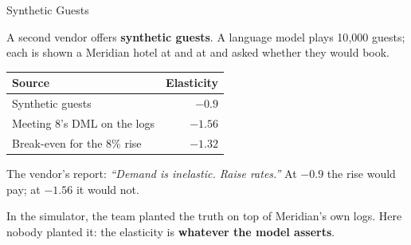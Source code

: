 \documentclass[aspectratio=169, 11pt, handout]{beamer}
\begin{document}
\begin{frame}{Synthetic Guests}

A second vendor offers \textbf{synthetic guests}. A language model plays 10{,}000 guests; each is shown a Meridian hotel at  and at  and asked whether they would book.

\begin{center}
\begin{tabular}{lr}
\toprule
\textbf{Source} & \textbf{Elasticity} \\
\midrule
Synthetic guests & $-0.9$ \\
Meeting 8's DML on the logs & $-1.56$ \\
Break-even for the 8\% rise & $-1.32$ \\
\bottomrule
\end{tabular}
\end{center}

\medskip

The vendor's report: \emph{``Demand is inelastic. Raise rates.''} At $-0.9$ the rise would pay; at $-1.56$ it would not.

\bigskip

In the simulator, the team planted the truth on top of Meridian's own logs. Here nobody planted it: the elasticity is \textbf{whatever the model asserts}.
\end{frame}
\end{document}
